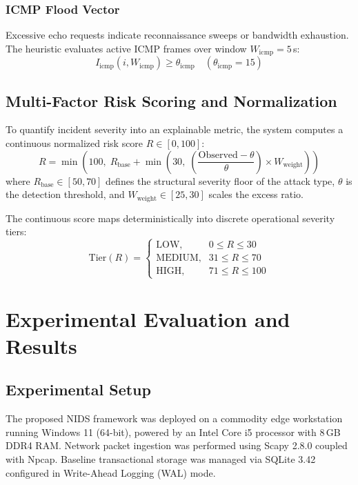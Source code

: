 \documentclass[conference]{IEEEtran}
\begin{document}
\subsubsection{ICMP Flood Vector}
Excessive echo requests indicate reconnaissance sweeps or bandwidth exhaustion. The heuristic evaluates active ICMP frames over window $W_{\text{icmp}} = 5$\,s:
\begin{equation}
I_{\text{icmp}}(i, W_{\text{icmp}}) \ge \theta_{\text{icmp}} \quad (\theta_{\text{icmp}} = 15)
\end{equation}

\subsection{Multi-Factor Risk Scoring and Normalization}
To quantify incident severity into an explainable metric, the system computes a continuous normalized risk score $R \in [0, 100]$:
\begin{equation}
R = \min\left(100, \; R_{\text{base}} + \min\left(30, \; \left(\frac{\text{Observed} - \theta}{\theta}\right) \times W_{\text{weight}}\right)\right)
\end{equation}
where $R_{\text{base}} \in [50, 70]$ defines the structural severity floor of the attack type, $\theta$ is the detection threshold, and $W_{\text{weight}} \in [25, 30]$ scales the excess ratio. 

The continuous score maps deterministically into discrete operational severity tiers:
\begin{equation}
\text{Tier}(R) = 
\begin{cases} 
\text{LOW}, & 0 \le R \le 30 \\
\text{MEDIUM}, & 31 \le R \le 70 \\
\text{HIGH}, & 71 \le R \le 100 
\end{cases}
\end{equation}

\section{Experimental Evaluation and Results}

\subsection{Experimental Setup}
The proposed NIDS framework was deployed on a commodity edge workstation running Windows 11 (64-bit), powered by an Intel Core i5 processor with 8\,GB DDR4 RAM. Network packet ingestion was performed using Scapy 2.8.0 coupled with Npcap. Baseline transactional storage was managed via SQLite 3.42 configured in Write-Ahead Logging (WAL) mode.
\end{document}
